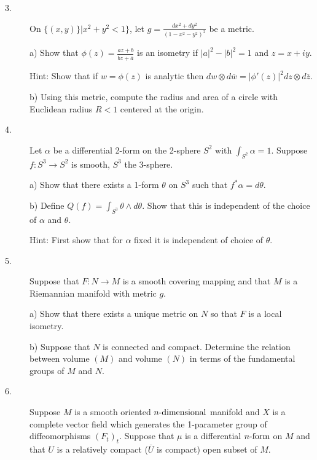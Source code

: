 \documentclass[bbb]{report}
\def\ds{\displaystyle}
\begin{document}
\begin{large}
\begin{description}
\vspace{.25in}

\item[3.]
On $\{(x,y)\}\bigg|x^2+y^2<1\}$, let
$g=\ds\frac{dx^2+dy^2}{(1-x^2-y^2)^2}$  be a metric.

\item[\quad] a) Show that
  $\phi(z)=\ds\frac{az+b}{\overline{b}z+\overline{a}}$
  is an isometry if $|a|^2-|b|^2=1$ and $z=x+iy$.

  Hint: Show that if $ w =\phi(z)$ is analytic then
  $d w \otimes d\overline{ w }
    =|\phi'(z)|^2dz\otimes d\overline{z}$.

\item[\quad] b) Using this metric, compute the radius and area
of a circle with Euclidean radius $R<1$ centered at the origin.

\vspace{.25in}

\item[4.]
Let $\alpha$ be a differential 2-form on the 2-sphere $S^2$ with
$\int_{S^2}\alpha=1$. Suppose $f:S^3\to S^2$ is smooth, $S^3$ the 3-sphere.

\item[\quad] a) Show that there exists a 1-form $\theta$ on $S^3$ such that
$f^\ast\alpha=d\theta$.

\item[\quad] b) Define $Q(f)=\int_{S^3}\theta\wedge d\theta$.
Show that this is independent of the choice of $\alpha$ and $\theta$.

Hint: First show that for $\alpha$ fixed it is independent of choice
of $\theta$.


\vspace{.25in}
\item[5.]
Suppose that $F:N\to M$ is a smooth covering mapping and that $M$
is a Riemannian manifold with metric $g$.

\item[\quad] a) Show that there exists a unique metric on $N$ so that
$F$ is a local isometry.

\item[\quad] b) Suppose that $N$ is connected and compact. Determine
the relation between volume $(M)$ and volume $(N)$ in terms of the
fundamental groups of $M$ and $N$.

\vspace{.25in}
\item[6.]
Suppose $M$ is a smooth oriented $n\hbox{-dimensional}$ manifold and
$X$ is a complete vector field which generates the 1-parameter
group of diffeomorphisms $(F_t)_t$.
Suppose that $\mu$ is a differential $n\hbox{-form}$ on $M$
and that $U$ is a relatively compact ($\overline{U}$ is compact) open
subset of $M$.


\end{description}
\end{large}
\end{document}

